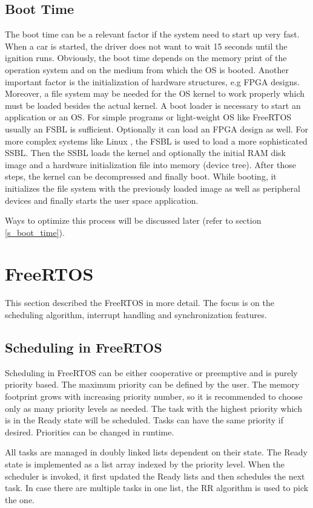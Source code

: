 \subsection{Boot Time}\label{ss_boot_time}
The boot time can be a relevant factor if the system need to start up very fast.
When a car is started, the driver does not want to wait 15 seconds until the ignition runs.
Obviously, the boot time depends on the memory print of the operation system and on the medium from which the \ac{OS} is booted.
Another important factor is the initialization of hardware structures, e.g \ac{FPGA} designs.
Moreover, a file system may be needed for the \ac{OS} kernel to work properly which must be loaded besides the actual kernel. 
A boot loader is necessary to start an application or an \ac{OS}.
For simple programs or light-weight \ac{OS} like FreeRTOS usually an \ac{FSBL} is sufficient.
Optionally it can load an \ac{FPGA} design as well.
For more complex systems like Linux \cite{jones:itlbp}, the \ac{FSBL} is used to load a more sophisticated \ac{SSBL}.
Then the \ac{SSBL} loads the kernel and optionally the initial RAM disk image and a hardware initialization file into memory (device tree).
After those steps, the kernel can be decompressed and finally boot.
While booting, it initializes the file system with the previously loaded image as well as peripheral devices and finally starts the user space application. 
\par
Ways to optimize this process will be discussed later (refer to section \ref{s_boot_time}).


\section{FreeRTOS}
This section described the FreeRTOS in more detail.
The focus is on the scheduling algorithm, interrupt handling and synchronization features.
\subsection{Scheduling in FreeRTOS}\label{ss_scheduling_in_freertos}
Scheduling in FreeRTOS \cite{freertos} can be either cooperative or preemptive and is purely priority based.
The maximum priority can be defined by the user. 
The memory footprint grows with increasing priority number, so it is recommended to choose only as many priority levels as needed.
The task with the highest priority which is in the Ready state will be scheduled. 
Tasks can have the same priority if desired.
Priorities can be changed in runtime.
\par
All tasks are managed in doubly linked lists dependent on their state. 
The Ready state is implemented as a list array indexed by the priority level. 
When the scheduler is invoked, it first updated the Ready lists and then schedules the next task.
In case there are multiple tasks in one list, the \ac{RR} algorithm is used to pick the one.
\par
[Picture Ready Queue] 

